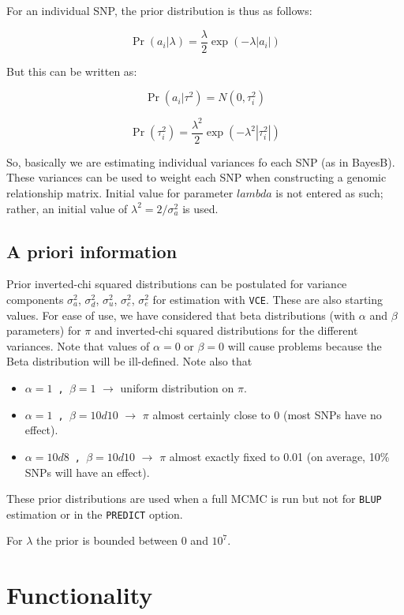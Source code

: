 \documentclass[a4paper,12pt,titlepage]{article}      %
\newcommand{\tm}{\texttt} %
\begin{document}
For an individual SNP, the prior distribution is thus as follows:

$$\Pr(a_i |\lambda)=\frac{\lambda}{2} \exp(-\lambda |a_i |)$$

But this can be written as:

$$\Pr(a_i |\tau^2)=N(0,\tau_i^2)$$

$$\Pr(\tau^2_i)=\frac{\lambda^2}{2} \exp(-\lambda^2 |\tau_i^2 |)$$

So, basically we are estimating individual variances fo each SNP (as in BayesB). These variances can be used to weight each SNP when constructing a genomic relationship matrix.
Initial value for parameter $lambda$ is not entered as such; rather, an initial value of  $\lambda^2=2/\sigma^2_a$ is used.


\subsection{A priori information}

Prior inverted-chi squared distributions can be postulated for  variance components $\sigma^2_a$, $\sigma^2_d$, $\sigma^2_u$, $\sigma^2_c$, $\sigma^2_e$ for estimation with \verb|VCE|. These are also starting values.
For ease of use, we have considered that beta distributions (with $\alpha$ and $\beta$ parameters) for $\pi$ and inverted-chi squared distributions for the different variances. 
Note that values of $\alpha=0$ or $\beta=0$ will cause problems because the Beta distribution will be ill-defined. Note also that
\begin{itemize}
 \item \tm{$\alpha=1$ , $\beta=1$} $\rightarrow$ uniform distribution on $\pi$. 
 \item \tm{$\alpha=1$ , $\beta=10d10$} $\rightarrow$ $\pi$ almost certainly close to 0 (most SNPs have no effect).
 \item \tm{$\alpha=10d8$ , $\beta=10d10$} $\rightarrow$ $\pi$ almost exactly fixed to 0.01 (on average, 10\% SNPs will have an effect).
\end{itemize}


These prior distributions are used when a full MCMC is run but not for \verb|BLUP| estimation or in the \verb|PREDICT| option.

For $\lambda$ the prior is bounded between 0 and $10^7$.


\section{Functionality}
\end{document}
